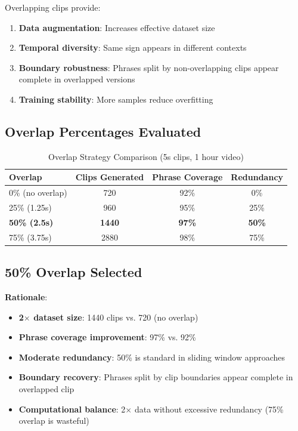\documentclass[11pt,a4paper]{article}
\begin{document}
Overlapping clips provide:
\begin{enumerate}
    \item \textbf{Data augmentation}: Increases effective dataset size
    \item \textbf{Temporal diversity}: Same sign appears in different contexts
    \item \textbf{Boundary robustness}: Phrases split by non-overlapping clips appear complete in overlapped versions
    \item \textbf{Training stability}: More samples reduce overfitting
\end{enumerate}

\subsection{Overlap Percentages Evaluated}

\begin{table}[htbp]
\centering
\caption{Overlap Strategy Comparison (5s clips, 1 hour video)}
\begin{tabular}{@{}lccc@{}}
\toprule
\textbf{Overlap} & \textbf{Clips Generated} & \textbf{Phrase Coverage} & \textbf{Redundancy} \\ \midrule
0\% (no overlap) & 720 & 92\% & 0\% \\
25\% (1.25s) & 960 & 95\% & 25\% \\
\textbf{50\% (2.5s)} & \textbf{1440} & \textbf{97\%} & \textbf{50\%} \\
75\% (3.75s) & 2880 & 98\% & 75\% \\
\bottomrule
\end{tabular}
\end{table}

\subsection{50\% Overlap Selected}

\textbf{Rationale}:
\begin{itemize}
    \item \textbf{2$\times$ dataset size}: 1440 clips vs. 720 (no overlap)
    \item \textbf{Phrase coverage improvement}: 97\% vs. 92\%
    \item \textbf{Moderate redundancy}: 50\% is standard in sliding window approaches
    \item \textbf{Boundary recovery}: Phrases split by clip boundaries appear complete in overlapped clip
    \item \textbf{Computational balance}: 2$\times$ data without excessive redundancy (75\% overlap is wasteful)
\end{itemize}
\end{document}

